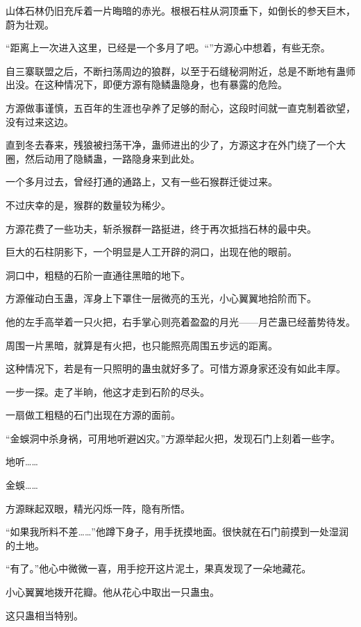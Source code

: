 
\begin{this_body}

山体石林仍旧充斥着一片晦暗的赤光。根根石柱从洞顶垂下，如倒长的参天巨木，蔚为壮观。

“距离上一次进入这里，已经是一个多月了吧。“”方源心中想着，有些无奈。

自三寨联盟之后，不断扫荡周边的狼群，以至于石缝秘洞附近，总是不断地有蛊师出没。在这种情况下，即便方源有隐鳞蛊隐身，也有暴露的危险。

方源做事谨慎，五百年的生涯也孕养了足够的耐心，这段时间就一直克制着欲望，没有过来这边。

直到冬去春来，残狼被扫荡干净，蛊师进出的少了，方源这才在外门绕了一个大圈，然后动用了隐鳞蛊，一路隐身来到此处。

一个多月过去，曾经打通的通路上，又有一些石猴群迁徙过来。

不过庆幸的是，猴群的数量较为稀少。

方源花费了一些功夫，斩杀猴群一路挺进，终于再次抵挡石林的最中央。

巨大的石柱阴影下，一个明显是人工开辟的洞口，出现在他的眼前。

洞口中，粗糙的石阶一直通往黑暗的地下。

方源催动白玉蛊，浑身上下罩住一层微亮的玉光，小心翼翼地拾阶而下。

他的左手高举着一只火把，右手掌心则亮着盈盈的月光——月芒蛊已经蓄势待发。

周围一片黑暗，就算是有火把，也只能照亮周围五步远的距离。

这种情况下，若是有一只照明的蛊虫就好多了。可惜方源身家还没有如此丰厚。

一步一探。走了半晌，他这才走到石阶的尽头。

一扇做工粗糙的石门出现在方源的面前。

“金蜈洞中杀身祸，可用地听避凶灾。”方源举起火把，发现石门上刻着一些字。

地听……

金蜈……

方源眯起双眼，精光闪烁一阵，隐有所悟。

“如果我所料不差……”他蹲下身子，用手抚摸地面。很快就在石门前摸到一处湿润的土地。

“有了。”他心中微微一喜，用手挖开这片泥土，果真发现了一朵地藏花。

小心翼翼地拨开花瓣。他从花心中取出一只蛊虫。

这只蛊相当特别。


\end{this_body}
